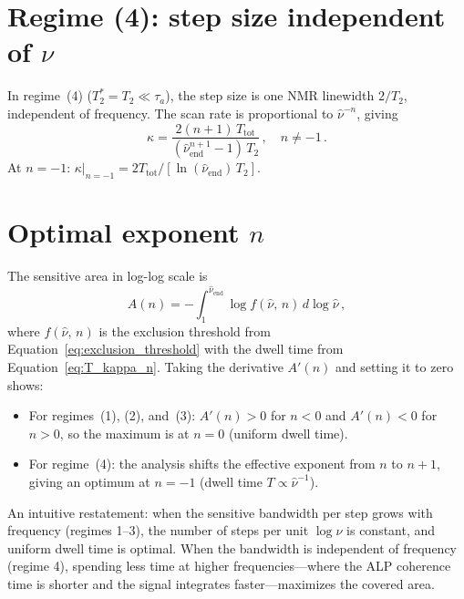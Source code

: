 \section*{Regime (4): step size independent of $\nu$}

In regime~(4) ($T_2^*=T_2 \ll \tau_a$), the step size is one NMR linewidth $2/T_2$, independent of frequency.
The scan rate is proportional to $\hat{\nu}^{-n}$, giving
\begin{equation}
    \kappa = \dfrac{2(n+1)\,T_{\mathrm{tot}}}{(\hat{\nu}_{\mathrm{end}}^{n+1}-1)\,T_2}
    \,,\quad n \ne -1\,.
\end{equation}
At $n=-1$: $\kappa|_{n=-1} = 2T_{\mathrm{tot}}/[\ln(\hat{\nu}_{\mathrm{end}})\,T_2]$.

\section*{Optimal exponent $n$}

The sensitive area in log-log scale is
\begin{equation}
    A(n) = -\int_{1}^{\hat{\nu}_{\mathrm{end}}} \log f(\hat{\nu},\,n)\,d\log\hat{\nu}
    \,,\label{eq:A_n}
\end{equation}
where $f(\hat{\nu},\,n)$ is the exclusion threshold from Equation~\eqref{eq:exclusion_threshold} with the dwell time from Equation~\eqref{eq:T_kappa_n}.
Taking the derivative $A'(n)$ and setting it to zero shows:
\begin{itemize}
    \item For regimes~(1), (2), and~(3): $A'(n) > 0$ for $n < 0$ and $A'(n) < 0$ for $n > 0$, so the maximum is at $n = 0$ (uniform dwell time).
    \item For regime~(4): the analysis shifts the effective exponent from $n$ to $n+1$, giving an optimum at $n = -1$ (dwell time $T \propto \hat{\nu}^{-1}$).
\end{itemize}

An intuitive restatement: when the sensitive bandwidth per step grows with frequency (regimes 1--3), the number of steps per unit $\log\nu$ is constant, and uniform dwell time is optimal.
When the bandwidth is independent of frequency (regime 4), spending less time at higher frequencies---where the ALP coherence time is shorter and the signal integrates faster---maximizes the covered area.
